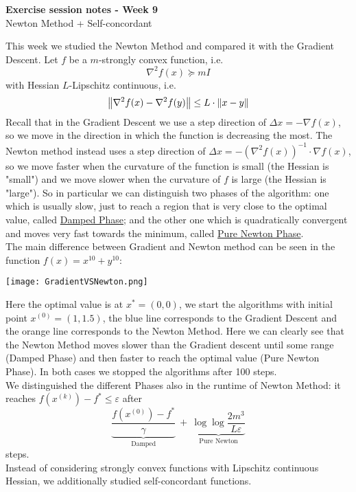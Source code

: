 \documentclass[answers]{exam}
\begin{document}
	$ $
	\begin{center}
		\huge \textbf{Exercise session notes - Week 9}  \\ \vspace*{3mm}
        \Large{Newton Method + Self-concordant}
	\end{center}
	$ $\\

    \noindent This week we studied the Newton Method and compared it with the Gradient Descent. Let $f$ be a $m$-strongly convex function, i.e.
    $$ \nabla^2 f(x)\succeq m I $$    
    with Hessian $L$-Lipschitz continuous, i.e. 
    $$ \left\lVert \nabla^2 f(x) - \nabla^2 f(y) \right\rVert \leq L\cdot \left\lVert x-y \right\rVert $$
    Recall that in the Gradient Descent we use a step direction of $\Delta x = -\nabla f(x)$, so we move in the direction in which the function is decreasing the most. The Newton method instead uses a step direction of $\Delta x = -(\nabla^2 f(x))^{-1}\cdot \nabla f(x)$, so we move faster when the curvature of the function is small (the Hessian is "small") and we move slower when the curvature of $f$ is large (the Hessian is "large").
    So in particular we can distinguish two phases of the algorithm: one which is usually slow, just to reach a region that is very close to the optimal value, called \underline{Damped Phase}; and the other one which is quadratically convergent and moves very fast towards the minimum, called \underline{Pure Newton Phase}. \\
    The main difference between Gradient and Newton method can be seen in the function $f(x) = x^{10} + y^{10}$:
    \begin{center}
        \texttt{[image: GradientVSNewton.png]}
    \end{center}
    Here the optimal value is at $x^* = (0,0)$, we start the algorithms with initial point $x^{(0)} = (1, 1.5)$, the blue line corresponds to the Gradient Descent and the orange line corresponds to the Newton Method. Here we can clearly see that the Newton Method moves slower than the Gradient descent until some range (Damped Phase) and then faster to reach the optimal value (Pure Newton Phase). In both cases we stopped the algorithms after 100 steps.\\
    We distinguished the different Phases also in the runtime of Newton Method: it reaches $f(x^{(k)}) - f^*\leq \varepsilon$ after 
    $$ \underbrace{\frac{f(x^{(0)}) - f^*}{\gamma}}_{\text{Damped}}\ +\ \underbrace{\log\log \frac{2m^3}{L\varepsilon}}_{\text{Pure Newton}} $$
    steps.\\
    Instead of considering strongly convex functions with Lipschitz continuous Hessian, we additionally studied self-concordant functions.
\end{document}
